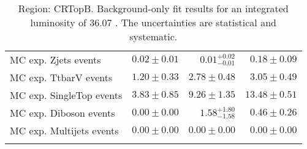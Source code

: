\begin{table}
\begin{center}
{\begin{tabular*}{\textwidth}{@{\extracolsep{\fill}}lrrr}
        MC exp. Zjets events         & $0.02 \pm 0.01$          & $0.01_{-0.01}^{+0.02}$          & $0.18 \pm 0.09$              \\
        MC exp. TtbarV events         & $1.20 \pm 0.33$          & $2.78 \pm 0.48$          & $3.05 \pm 0.49$              \\
        MC exp. SingleTop events         & $3.83 \pm 0.85$          & $9.26 \pm 1.35$          & $13.48 \pm 0.51$              \\
        MC exp. Diboson events         & $0.00 \pm 0.00$          & $1.58_{-1.58}^{+1.80}$          & $0.46 \pm 0.26$              \\
        MC exp. Multijets events         & $0.00 \pm 0.00$          & $0.00 \pm 0.00$          & $0.00 \pm 0.00$              \\
\noalign{\smallskip}\hline\noalign{\smallskip}
\end{tabular*}
}
\end{center}
\caption{Region: CRTopB. Background-only fit results for an integrated luminosity of 36.07 \ifb. The uncertainties are statistical and systematic.
}
\label{table.bkgonly.CRTopB}
\end{table}
%